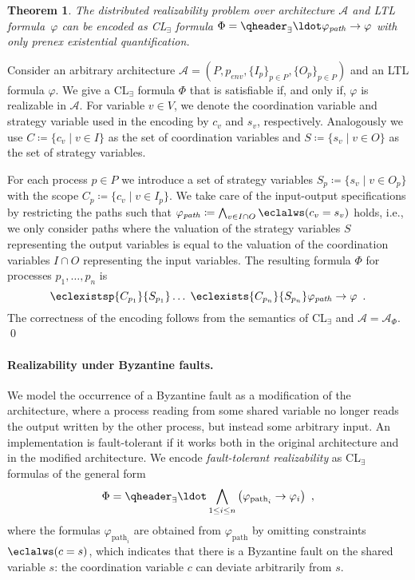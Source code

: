 \documentclass{LMCS}
\theoremstyle{plain}\newtheorem{theorem}[thm]{Theorem}
\theoremstyle{plain}\newtheorem{lemma}[thm]{Lemma}
\theoremstyle{plain}\newtheorem{proposition}[thm]{Proposition}
\theoremstyle{plain}\newtheorem{corollary}[thm]{Corollary}
\theoremstyle{definition}\newtheorem{definition}{Definition}[section]
\begin{document}
\begin{theorem} \label{thm:ecl_encoding_distributed_synthesis}
The distributed realizability problem over architecture $\mathcal{A}$ and LTL formula~$\varphi$ can be encoded as CL$_\exists$ formula $\Phi = \qheader_\exists \ldot \varphi_\mathit{path} \rightarrow \varphi$ with only prenex existential quantification.
\end{theorem}
\proof
Consider an arbitrary architecture $\mathcal{A} = (P,p_\mathit{env},\{I_p\}_{p \in P}, \{O_p\}_{p \in P})$ and an LTL formula $\varphi$.
We give a CL$_\exists$ formula $\Phi$ that is satisfiable if, and only if, $\varphi$ is realizable in $\mathcal{A}$.
For variable $v \in V$, we denote the coordination variable and strategy variable used in the encoding by $c_v$ and $s_v$, respectively.
Analogously we use $C \coloneqq \{c_v \mid v \in I\}$ as the set of coordination variables and $S \coloneqq \{s_v \mid v \in O\}$ as the set of strategy variables.

For each process $p \in P$ we introduce a set of strategy variables $S_p \coloneqq \{s_v \mid v \in O_p\}$ with the scope $C_p \coloneqq \{c_v \mid v \in I_p\}$.
We take care of the input-output specifications by restricting the paths such that $\varphi_{\mathit{path}} \coloneqq \bigwedge_{v \in I \cap O} \eclalws (c_v = s_v)$ holds, i.e., we only consider paths where the valuation of the strategy variables $S$ representing the output variables is equal to the valuation of the coordination variables $I \cap O$ representing the input variables. The resulting formula $\Phi$ for processes $p_1,\ldots,p_n$ is
\begin{equation*}
\eclexistsp{C_{p_1}}{S_{p_1}} \ldots\; \eclexists{C_{p_n}}{S_{p_n}} \varphi_{\mathit{path}} \rightarrow \varphi \enspace.
\end{equation*}
The correctness of the encoding follows from the semantics of CL$_\exists$ and $\mathcal{A} = \mathcal{A}_\Phi$.
\qed

\paragraph{\bf Realizability under Byzantine faults.} 
\label{sec:multiple-architecture-realizability}
We model the occurrence of a Byzantine fault as a modification of the architecture, where a process reading from some shared variable no longer reads the output written by the other process, but instead some arbitrary input. An implementation is fault-tolerant if it works both in the original architecture and in the modified architecture.
We encode \emph{fault-tolerant realizability} as   CL$_\exists$ formulas of the general form
\begin{equation}
  \Phi = \qheader_\exists \ldot \bigwedge_{1 \leq i \leq n} \big( \varphi_{\text{path}_i} \rightarrow \varphi_i \big) \enspace ,  
\end{equation}
where the formulas $\varphi_{\text{path}_i}$ are obtained from $\varphi_{\text{path}}$ by omitting constraints $\eclalws (c = s)$, which indicates that there is a Byzantine fault on the shared variable $s$: 
the coordination variable $c$ can deviate arbitrarily from $s$.
\end{document}
